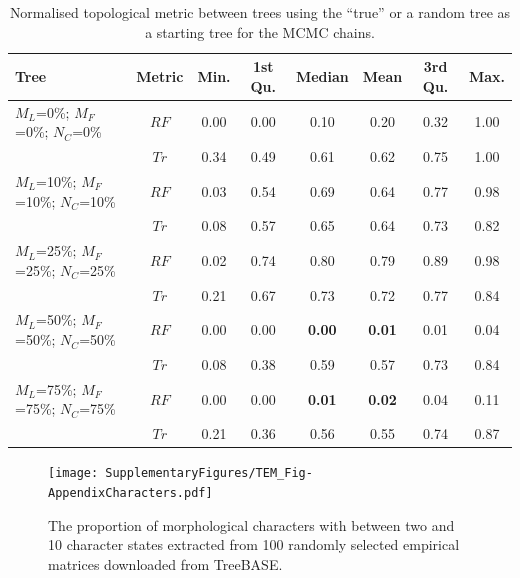 \documentclass[12pt,letterpaper]{article}
\begin{document}
\begin{table}[!ht]
\caption{Normalised topological metric between trees using the ``true'' or a random tree as a starting tree for the MCMC chains.}
\centering
\begin{tabular}{|l|c|c|c|c|c|c|c|}
  \hline
 Tree &  Metric & Min. & 1st Qu. & Median & Mean & 3rd Qu. & Max. \\ 
  \hline
    $M_L$=0\%; $M_F$=0\%; $N_C$=0\%          & $RF$ & 0.00 & 0.00 & 0.10 & 0.20 & 0.32 & 1.00 \\ 
                                             & $Tr$ & 0.34 & 0.49 & 0.61 & 0.62 & 0.75 & 1.00 \\ 
    $M_L$=10\%; $M_F$=10\%; $N_C$=10\%       & $RF$ & 0.03 & 0.54 & 0.69 & 0.64 & 0.77 & 0.98 \\ 
                                             & $Tr$ & 0.08 & 0.57 & 0.65 & 0.64 & 0.73 & 0.82 \\ 
    $M_L$=25\%; $M_F$=25\%; $N_C$=25\%       & $RF$ & 0.02 & 0.74 & 0.80 & 0.79 & 0.89 & 0.98 \\ 
                                             & $Tr$ & 0.21 & 0.67 & 0.73 & 0.72 & 0.77 & 0.84 \\ 
    $M_L$=50\%; $M_F$=50\%; $N_C$=50\%       & $RF$ & 0.00 & 0.00 & \textbf{0.00} & \textbf{0.01} & 0.01 & 0.04 \\ 
                                             & $Tr$ & 0.08 & 0.38 & 0.59 & 0.57 & 0.73 & 0.84 \\ 
    $M_L$=75\%; $M_F$=75\%; $N_C$=75\%       & $RF$ & 0.00 & 0.00 & \textbf{0.01} & \textbf{0.02} & 0.04 & 0.11 \\ 
                                             & $Tr$ & 0.21 & 0.36 & 0.56 & 0.55 & 0.74 & 0.87 \\ 
   \hline
\end{tabular}
\label{Tab_Results-Difference_methods}
\end{table}


\begin{figure}
\centering
\texttt{[image: SupplementaryFigures/TEM\_Fig-AppendixCharacters.pdf]}
\caption{The proportion of morphological characters with between two and 10 character states extracted from 100 randomly selected empirical matrices downloaded from TreeBASE.}
\label{Fig_AppendixCharacters}
\end{figure}
\end{document}
